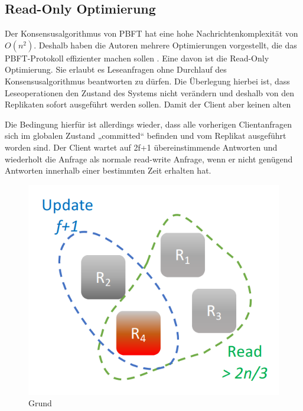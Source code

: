 \documentclass[nonacm,sigconf,natbib=false]{acmart}
\begin{document}
\subsection{Read-Only Optimierung}

Der Konsensusalgorithmus von PBFT hat eine hohe Nachrichtenkomplexität von $O(n^2)$. Deshalb haben die Autoren mehrere Optimierungen vorgestellt, die das PBFT-Protokoll effizienter machen sollen \cite{pbft-optimization}. Eine davon ist die Read-Only Optimierung. Sie erlaubt es Leseanfragen ohne Durchlauf des Konsensusalgorithmus beantworten zu dürfen. Die Überlegung hierbei ist, dass Leseoperationen den Zustand des Systems nicht verändern und deshalb von den Replikaten sofort ausgeführt werden sollen. Damit der Client aber keinen alten 


Die Bedingung hierfür ist allerdings wieder, dass alle vorherigen Clientanfragen sich im globalen Zustand „committed“ befinden und vom Replikat ausgeführt worden sind. Der Client wartet auf 2f+1 übereinstimmende Antworten und wiederholt die Anfrage als normale read-write Anfrage, wenn er nicht genügend Antworten innerhalb einer bestimmten Zeit erhalten hat.

\begin{figure}[htbp]
  \centering
  \includegraphics[width=\linewidth]{pbft-optimierung-update-quorum.png}
  \caption{Grund}
  \label{fig:pbft-optimization}
\end{figure}


\printbibliography
\end{document}

